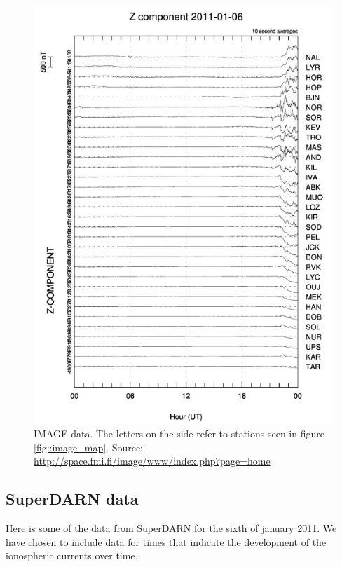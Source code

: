 \documentclass[norsk,a4paper,11pt]{article}
\begin{document}
\begin{multicols}{2}
\begin{figure}[H]
	\includegraphics[scale = 0.9]{Figures/Z_gram.jpg}
	\centering
	\caption{IMAGE data. The letters on the side refer to stations seen in figure \ref{fig::image_map}. Source: \url{http://space.fmi.fi/image/www/index.php?page=home}}
	\label{fig:image_data}
\end{figure}

\subsection{SuperDARN data}
Here is some of the data from SuperDARN for the sixth of january 2011. We have chosen to include data for times that indicate the development of the ionospheric currents over time. 


\end{multicols}
\end{document}
